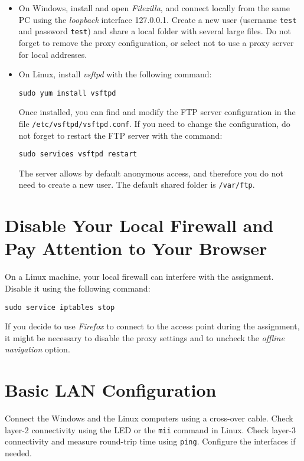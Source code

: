 \begin{itemize}

\item On Windows, install and open \emph{Filezilla}, and connect locally from the same PC using the \emph{loopback} interface 127.0.0.1. Create a new user (username \texttt{\color{blue}test} and password \texttt{\color{blue}test}) and share a local folder with several large files. Do not forget to remove the proxy configuration, or select not to use a proxy server for local addresses.

\item On Linux, install \emph{vsftpd} with the following command:
\begin{lstlisting}
sudo yum install vsftpd
\end{lstlisting}
    Once installed, you can find and modify the FTP server configuration in the file \texttt{/etc/vsftpd/vsftpd.conf}. If you need to change the configuration, do not forget to restart the FTP server with the command:
\begin{lstlisting}
sudo services vsftpd restart
\end{lstlisting}
    The server allows by default anonymous access, and therefore you do not need to create a new user. The default shared folder is \texttt{/var/ftp}.
\end{itemize}

\section{Disable Your Local Firewall and Pay Attention to Your Browser}

On a Linux machine, your local firewall can interfere with the assignment. Disable it using the following command:

\begin{lstlisting}
sudo service iptables stop
\end{lstlisting}

If you decide to use \emph{Firefox} to connect to the access point during the assignment, it might be necessary to disable the proxy settings and to uncheck the \emph{offline navigation} option.

\section{Basic LAN Configuration}

Connect the Windows and the Linux computers using a cross-over cable. Check layer-2 connectivity using the LED or the \texttt{\color{blue}mii} command in Linux. Check layer-3 connectivity and measure round-trip time using \texttt{\color{blue}ping}. Configure the interfaces if needed.

